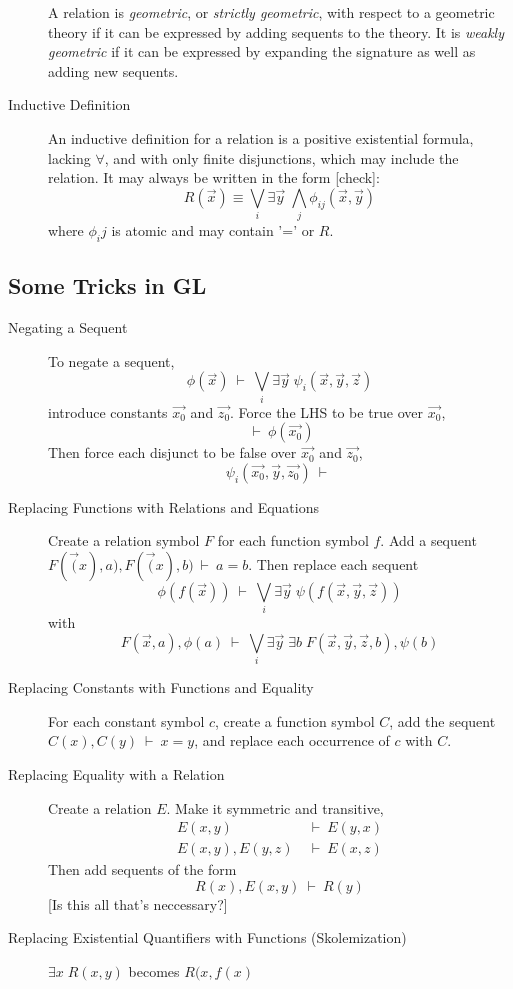 \documentclass[12pt]{article}
\newcommand{\OR}{\bigvee}
\newcommand{\AND}{\bigwedge}
\newcommand{\seq}[2]{#1 \ \vdash\  #2}
\newcommand{\aseq}[2]{#1 & \ \vdash\  #2}
\begin{document}
\begin{description}
    A relation is \emph{geometric}, or \emph{strictly geometric}, with
    respect to a geometric theory if it can be expressed by adding
    sequents to the theory.  It is \emph{weakly geometric} if it can
    be expressed by expanding the signature as well as adding new
    sequents.

  \item[Inductive Definition] An inductive definition for a relation
    is a positive existential formula, lacking $\forall$, and with
    only finite disjunctions, which may include the relation. It may
    always be written in the form [check]:
    $$ R(\vec{x}) \equiv \OR_i \exists \vec{y}\; \AND_j
    \phi_{ij}(\vec{x}, \vec{y}) $$ where $\phi_ij$ is atomic and may
    contain '=' or $R$.

  \end{description}


\subsection{Some Tricks in GL}

  \begin{description}

  \item[Negating a Sequent] To negate a sequent,
    $$ \seq{\phi(\vec{x})} {\OR_i \exists \vec{y}\; \psi_i(\vec{x},
    \vec{y}, \vec{z})} $$ introduce constants $\vec{x_0}$ and
    $\vec{z_0}$. Force the LHS to be true over $\vec{x_0}$,
    $$ \seq{}{\phi(\vec{x_0})} $$ Then force each disjunct to be false
    over $\vec{x_0}$ and $\vec{z_0}$,
    $$ \seq{\psi_i(\vec{x_0}, \vec{y}, \vec{z_0})}{} $$

  \item[Replacing Functions with Relations and Equations] Create a
    relation symbol $F$ for each function symbol $f$. Add a sequent
    $\seq{F(\vec(x), a), F(\vec(x), b)}{a = b}$. Then replace each
    sequent
    $$ \seq{\phi(f(\vec{x}))} {\OR_i \exists \vec{y}\; \psi(f(\vec{x},
      \vec{y}, \vec{z}))} $$ with
    $$ \seq{F(\vec{x}, a), \phi(a)} {\OR_i \exists \vec{y}\; \exists
      b\; F(\vec{x}, \vec{y}, \vec{z}, b), \psi(b)} $$

  \item[Replacing Constants with Functions and Equality] For each
    constant symbol $c$, create a function symbol $C$, add the sequent
    $\seq{C(x), C(y)}{x = y}$, and replace each occurrence of $c$ with
    $C$.

  \item[Replacing Equality with a Relation] Create a relation
    $E$. Make it symmetric and transitive,
    \begin{align*}
      \aseq{E(x, y)}{E(y, x)} \\ \aseq{E(x, y), E(y, z)}{E(x, z)}
    \end{align*}
    Then add sequents of the form
    $$\seq{R(x), E(x, y)}{R(y)}$$ [Is this all that's neccessary?]

  \item[Replacing Existential Quantifiers with Functions
    (Skolemization)] $\exists x\; R(x, y)$ becomes $R(x, f(x)$

  \end{description}
\end{document}
